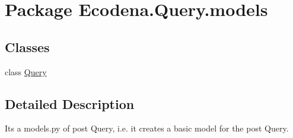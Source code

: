\hypertarget{namespace_ecodena_1_1_query_1_1models}{
\section{Package Ecodena.Query.models}
\label{d6/d05/namespace_ecodena_1_1_query_1_1models}
}
\subsection*{Classes}
\begin{DoxyCompactItemize}
\item 
class \hyperlink{class_ecodena_1_1_query_1_1models_1_1_query}{Query}
\end{DoxyCompactItemize}


\subsection{Detailed Description}
\begin{DoxyVerb}Its a models.py of post Query, i.e. it creates a basic model for the post Query.\end{DoxyVerb}
 